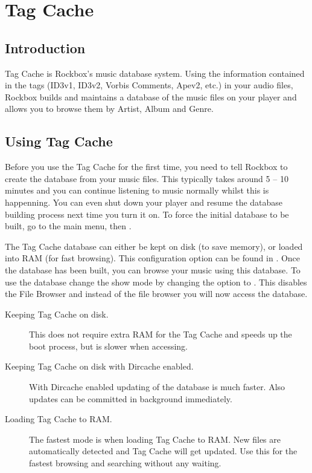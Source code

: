 \section{Tag Cache\label{ref:tagcache}} 

\subsection{Introduction}
Tag Cache is Rockbox's music database system. Using the information 
contained in the tags (ID3v1, ID3v2, Vorbis Comments, Apev2, etc.) in your 
audio files, Rockbox builds and maintains a database of the music files on 
your player and allows you to browse them by Artist, Album and Genre.

\subsection{Using Tag Cache}
Before you use the Tag Cache for the first time, you need to tell Rockbox to
create the database from your music files. This typically takes around 
5 -- 10 minutes and you can continue listening to music normally whilst 
this is happenning. You can even shut down your player and resume the 
database building process next time you turn it on.
To force the initial database to be built, go to the main menu, then 
.

The Tag Cache database can either be kept on disk (to save memory), or 
loaded into RAM (for fast browsing). This configuration option can be 
found in .
Once the database has been built, you can browse your music using this 
database. To use the database change the show mode by changing the 
 option to 
. This disables the File Browser and instead of the file
browser you will now access the database.
%
\begin{description}
\item[Keeping Tag Cache on disk.] This does not require extra RAM for the
Tag Cache and speeds up the boot process, but is slower when accessing.
\item[Keeping Tag Cache on disk with Dircache enabled.] With Dircache
enabled updating of the database is much faster. Also updates can be
committed in background immediately.
\item[Loading Tag Cache to RAM.] The fastest mode is when loading Tag Cache
to RAM. New files are automatically detected and Tag Cache will get updated.
Use this for the fastest browsing and searching without any waiting.
\end{description}

